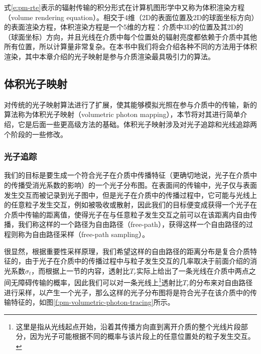 式\ref{e:pm-rte}表示的辐射传输的积分形式在计算机图形学中又称为体积渲染方程（volume rendering equation）。相交于4维（2D的表面位置及2D的球面坐标方向）的表面渲染方程，体积渲染方程是一个5维的方程：介质中3D的位置及其2D的（球面坐标）方向，并且光线在介质中每个位置处的辐射亮度都依赖于介质中其他所有位置，所以计算量非常复杂。在本书中我们将会介绍各种不同的方法用于体积渲染，其中本章介绍的光子映射是参与介质渲染最具吸引力的算法。





\subsection{体积光子映射}\label{sec:pm-volumetric-phptpn-mapping}
\cite{a:EfficientSimulationofLightTransportinSceneswithParticipatingMediausingPhotonMaps}对传统的光子映射算法进行了扩展，使其能够模拟光照在参与介质中的传输，新的算法称为体积光子映射（volumetric photon mapping），本节将对其进行简单介绍，它是后面一些更高级方法的基础。体积光子映射涉及对光子追踪和光线追踪两个阶段的一些修改。



\subsubsection{光子追踪}
我们的目标是要生成一个符合光子在介质中传播特征（更确切地说，光子在介质中的传播受消光系数的影响）的一个光子分布图。在表面间的传输中，光子仅与表面发生交互而被记录到光子图中，但是光子在介质中的传播过程中，它可能与光线上的任意粒子发生交互，例如被吸收或散射，因此我们的目标便变成获得一个光子在介质中传输的距离值，使得光子在与任意粒子发生交互之前可以在该距离内自由传播，我们称这样的一个路径为自由路径（free-path），获得这样一个自由路径的过程则称为自由路径采样（free-path sampling）。

很显然，根据重要性采样原理，我们希望这样的自由路径的距离分布是复合介质特征的，由于光子在介质中的传播过程中与粒子发生交互的几率取决于前面介绍的消光系数$\sigma_t$，而根据上一节的内容，透射比$T_r$实际上给出了一条光线在介质中两点之间无障碍传输的概率，因此我们可以对一条光线上\footnote{这里是指从光线起点开始，沿着其传播方向直到离开介质的整个光线片段部分，因为光子可能根据不同的概率与该片段上的任意位置处的粒子发生交互。}透射比$T_r$的分布来对自由路径进行采样，以产生一个光子，那么这样的光子分布图将是符合光子在该介质中的传输特征的，如图\ref{f:pm-volumetric-photon-tracing}所示。

